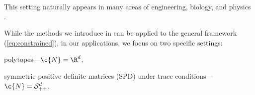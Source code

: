 This setting naturally appears in many areas of engineering, biology, and physics \parencite{boyd2004convex, han2006inverse, lukens2020practical}.

While the methods we introduce in  can be applied to the general framework (\ref{eq:constrained}), in our applications, we focus on two specific settings: \begin{enumerate*}[label=(\alph*)] \item polytopes---\(\c{N} = \R^d\), \item symmetric positive definite matrices (SPD) under trace conditions---\(\c{N}=\mathcal{S}_{++}^{d}\).
\end{enumerate*}


